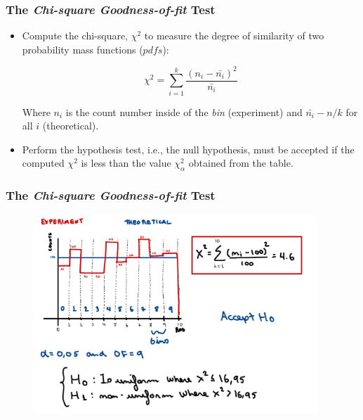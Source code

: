 \begin{frame}
    \frametitle{The \textit{Chi-square Goodness-of-fit} Test}
    
    \begin{itemize}

        \item Compute the chi-square, $\chi^2$ to measure the degree of similarity of two
        probability mass functions ($pdfs$):

        $$\chi^2 = \sum_{i=1}^k\frac{(n_i - \bar{n_i})^2}{\bar{n_i}}$$
    
        Where $n_i$ is the count number inside of the \textit{bin} (experiment) and 
        $\bar{n_i} - n/k$ for all $i$ (theoretical).

        \item Perform the hypothesis test, i.e., the null hypothesis, must be accepted if the computed
        $\chi^2$ is less than the value $\chi_{\alpha}^2$ obtained from the table.


    \end{itemize}


\end{frame}


\begin{frame}
    \frametitle{The \textit{Chi-square Goodness-of-fit} Test}
    \begin{figure}
        \centering
        \includegraphics[width=0.95\textwidth]{sections/prng/figures/chi2_example.pdf}
    \end{figure}
\end{frame}



